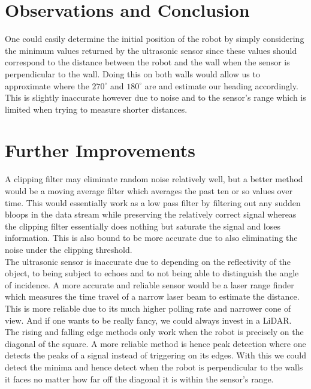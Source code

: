 \documentclass[letterpaper,12pt]{article}
\begin{document}
\section{Observations and Conclusion}{
One could easily determine the initial position of the robot by simply considering the minimum values returned by the ultrasonic sensor since these values should correspond to the distance between the robot and the wall when the sensor is perpendicular to the wall. Doing this on both walls would allow us to approximate where the $270^{\circ}$ and $180^{\circ}$ are and estimate our heading accordingly. This is slightly inaccurate however due to noise and to the sensor's range which is limited when trying to measure shorter distances.
}

\section{Further Improvements}{
A clipping filter may eliminate random noise relatively well, but a better method would be a moving average filter which averages the past ten or so values over time. This would essentially work as a low pass filter by filtering out any sudden bloops in the data stream while preserving the relatively correct signal whereas the clipping filter essentially does nothing but saturate the signal and loses information. This is also bound to be more accurate due to also eliminating the noise under the clipping threshold.\\

The ultrasonic sensor is inaccurate due to depending on the reflectivity of the object, to being subject to echoes and to not being able to distinguish the angle of incidence. A more accurate and reliable sensor would be a laser range finder which measures the time travel of a narrow laser beam to estimate the distance. This is more reliable due to its much higher polling rate and narrower cone of view. And if one wants to be really fancy, we could always invest in a LiDAR.\\

The rising and falling edge methods only work when the robot is precisely on the diagonal of the square. A more reliable method is hence peak detection where one detects the peaks of a signal instead of triggering on its edges. With this we could detect the minima and hence detect when the robot is perpendicular to the walls it faces no matter how far off the diagonal it is within the sensor's range.

}
\end{document}
